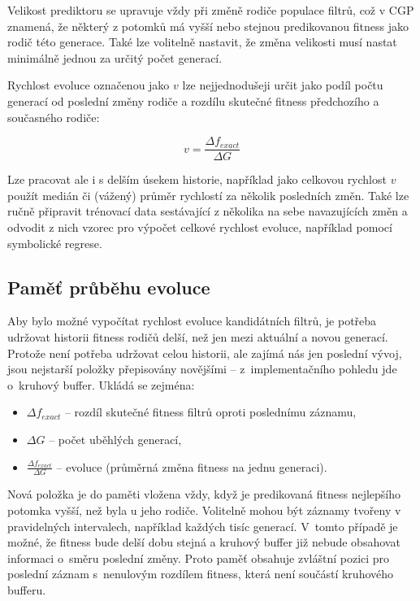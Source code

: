 Velikost prediktoru se upravuje vždy při změně rodiče populace filtrů, což v CGP znamená, že některý z potomků má vyšší nebo stejnou predikovanou fitness jako rodič této generace. Také lze volitelně nastavit, že změna velikosti musí nastat minimálně jednou za určitý počet generací.

Rychlost evoluce označenou jako $v$ lze nejjednodušeji určit jako podíl počtu generací od poslední změny rodiče a rozdílu skutečné fitness předchozího a současného rodiče:

\begin{equation}
    v = \frac{\Delta{}f_{\mathit{exact}}}{\Delta{}G}
\end{equation}

Lze pracovat ale i s delším úsekem historie, například jako celkovou rychlost $v$ použít medián či (vážený) průměr rychlostí za několik posledních změn. Také lze ručně připravit trénovací data sestávající z několika na sebe navazujících změn a odvodit z nich vzorec pro výpočet celkové rychlost evoluce, například pomocí symbolické regrese.

\subsection{Paměť průběhu evoluce}

Aby bylo možné vypočítat rychlost evoluce kandidátních filtrů, je potřeba udržovat historii fitness rodičů delší, než jen mezi aktuální a novou generací. Protože není potřeba udržovat celou historii, ale zajímá nás jen poslední vývoj, jsou nejstarší položky přepisovány novějšími -- z~implementačního pohledu jde o~kruhový buffer. Ukládá se zejména:

\begin{itemize}
    \item $\Delta{}f_{\mathit{exact}}$ -- rozdíl skutečné fitness filtrů oproti poslednímu záznamu,
    \item $\Delta{}G$ -- počet uběhlých generací,
    \item $\frac{\Delta{}f_{\mathit{exact}}}{\Delta{}G}$ --  evoluce (průměrná změna fitness na jednu generaci).
\end{itemize}

Nová položka je do paměti vložena vždy, když je predikovaná fitness nejlepšího potomka vyšší, než byla u jeho rodiče. Volitelně mohou být záznamy tvořeny v pravidelných intervalech, například každých tisíc generací. V~tomto případě je možné, že fitness bude delší dobu stejná a kruhový buffer již nebude obsahovat informaci o~směru poslední změny. Proto paměť obsahuje zvláštní pozici pro poslední záznam s~nenulovým rozdílem fitness, která není součástí kruhového bufferu.


